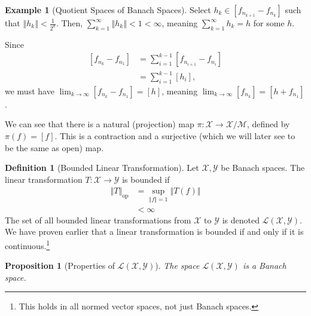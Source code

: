 \documentclass[10pt]{extarticle}
\newcommand{\norm}[1]{\left\Vert #1\right\Vert}
\theoremstyle{plain}
\newtheorem*{proposition}{Proposition}
\theoremstyle{definition}
\newtheorem*{definition}{Definition}
\newtheorem*{example}{Example}
\theoremstyle{note}
\renewcommand{\newline}{\hfill\break}
\begin{document}
\begin{example}[Quotient Spaces of Banach Spaces]
  Select $h_k \in \left[f_{n_{k+1}} - f_{n_k}\right]$ such that $\norm{h_k} < \frac{1}{2^k}$. Then, $\sum_{k=1}^{\infty}\norm{h_k} < 1 < \infty$, meaning $\sum_{k=1}^{\infty}h_k = h$ for some $h$.\newline

  Since
  \begin{align*}
    \left[f_{n_k} - f_{n_1}\right] &= \sum_{i=1}^{k-1}\left[f_{n_{i+1}} - f_{n_i}\right]\\
                                   &= \sum_{i=1}^{k-1}\left[h_i\right],
  \end{align*}
  we must have $\lim_{k\rightarrow\infty}\left[f_{n_k} - f_{n_1}\right] = [h]$, meaning $\lim_{k\rightarrow\infty}\left[f_{n_k}\right] = \left[h + f_{n_1}\right]$.
\end{example}
We can see that there is a natural (projection) map $\pi: \mathcal{X}\rightarrow \mathcal{X}/\mathcal{M}$, defined by $\pi(f) = [f]$. This is a contraction and a surjective (which we will later see to be the same as open) map.
\begin{definition}[Bounded Linear Transformation]
Let $\mathcal{X},\mathcal{Y}$ be Banach spaces. The linear transformation $T: \mathcal{X}\rightarrow \mathcal{Y}$ is bounded if
\begin{align*}
  \norm{T}_{\text{op}} &= \sup_{\norm{f} = 1}\norm{T(f)}\\
                       &< \infty
\end{align*}
The set of all bounded linear transformations from $\mathcal{X}$ to $\mathcal{Y}$ is denoted $\mathcal{L}\left(\mathcal{X},\mathcal{Y}\right)$. We have proven earlier that a linear transformation is bounded if and only if it is continuous.\footnote{This holds in all normed vector spaces, not just Banach spaces.}
\end{definition}
\begin{proposition}[Properties of $\mathcal{L}\left(\mathcal{X},\mathcal{Y}\right)$]
  The space $\mathcal{L}\left(\mathcal{X},\mathcal{Y}\right)$ is a Banach space.
\end{proposition}
\end{document}
